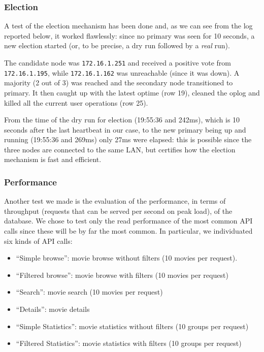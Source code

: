 \documentclass[11pt]{article}
\begin{document}
\subsubsection{Election}
A test of the election mechanism has been done and, as we can see from the log reported below, it worked flawlessly: since no primary was seen for 10 seconds, a new election started (or, to be precise, a dry run followed by a \textit{real} run).


The candidate node was \lstinline{172.16.1.251} and received a positive vote from \lstinline{172.16.1.195}, while \lstinline{172.16.1.162} was unreachable (since it was down). A majority (2 out of 3) was reached and the secondary node transitioned to primary. It then caught up with the latest optime (row 19), cleaned the oplog and killed all the current user operations (row 25).

From the time of the dry run for election (19:55:36 and 242ms), which is 10 seconds after the last heartbeat in our case, to the new primary being up and running (19:55:36 and 269ms) only 27ms were elapsed: this is possible since the three nodes are connected to the same LAN, but certifies how the election mechanism is fast and efficient.

\subsubsection{Performance}
Another test we made is the evaluation of the performance, in terms of throughput (requests that can be served per second on peak load), of the database. We chose to test only the read performance of the most common API calls since these will be by far the most common. In particular, we individuated six kinds of API calls:
\begin{itemize}
	\item ``Simple browse'': movie browse without filters (10 movies per request).
	\item ``Filtered browse'': movie browse with filters (10 movies per request)
	\item ``Search'': movie search (10 movies per request)
	\item ``Details'': movie details
	\item ``Simple Statistics'': movie statistics without filters (10 groups per request)
	\item ``Filtered Statistics'': movie statistics with filters (10 groups per request)
\end{itemize}
\end{document}
